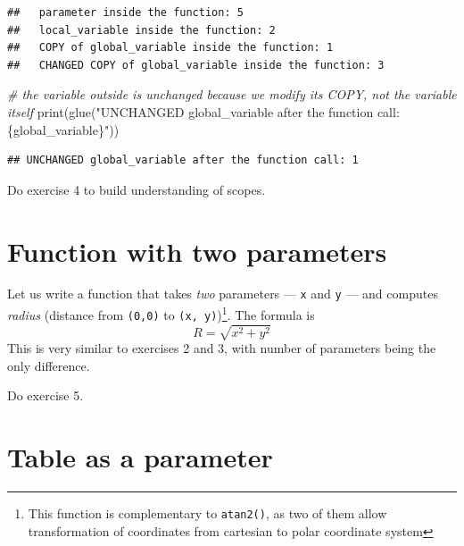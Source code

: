 \documentclass[
]{book}
\newenvironment{Shaded}{\begin{snugshade}}{\end{snugshade}}
\newcommand{\CommentTok}[1]{\textcolor[rgb]{0.56,0.35,0.01}{\textit{#1}}}
\newcommand{\FunctionTok}[1]{\textcolor[rgb]{0.00,0.00,0.00}{#1}}
\newcommand{\NormalTok}[1]{#1}
\newcommand{\StringTok}[1]{\textcolor[rgb]{0.31,0.60,0.02}{#1}}
\begin{document}
\begin{verbatim}
##   parameter inside the function: 5
##   local_variable inside the function: 2
##   COPY of global_variable inside the function: 1
##   CHANGED COPY of global_variable inside the function: 3
\end{verbatim}

\begin{Shaded}
\begin{Highlighting}[]
\CommentTok{\# the variable outside is unchanged because we modify its COPY, not the variable itself}
\FunctionTok{print}\NormalTok{(}\FunctionTok{glue}\NormalTok{(}\StringTok{"UNCHANGED global\_variable after the function call: \{global\_variable\}"}\NormalTok{))}
\end{Highlighting}
\end{Shaded}

\begin{verbatim}
## UNCHANGED global_variable after the function call: 1
\end{verbatim}

Do exercise 4 to build understanding of scopes.

\hypertarget{function-with-two-parameters}{%
\section{Function with two parameters}\label{function-with-two-parameters}}

Let us write a function that takes \emph{two} parameters --- \texttt{x} and \texttt{y} --- and computes \emph{radius} (distance from \texttt{(0,0)} to \texttt{(x,\ y)})\footnote{This function is complementary to \texttt{atan2()}, as two of them allow transformation of coordinates from cartesian to polar coordinate system}. The formula is
\[R = \sqrt{x^2 + y^2}\]
This is very similar to exercises 2 and 3, with number of parameters being the only difference.

Do exercise 5.

\hypertarget{table-as-a-parameter}{%
\section{Table as a parameter}\label{table-as-a-parameter}}
\end{document}
